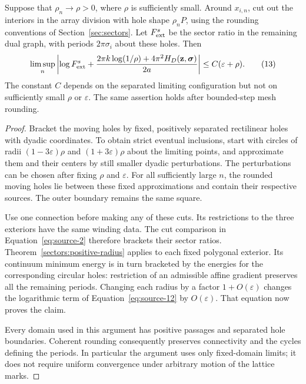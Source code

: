 \begin{lemma}\label{correlations:exterior-lattice}
Suppose that \(\rho_n\to\rho>0\), where \(\rho\) is sufficiently
small.  Around \(x_{i,n}\), cut out the interiors in the array
division with hole shape \(\rho_nP\), using the rounding conventions
of Section~\ref{sec:sectors}.  Let \(F_{\rm ext}^s\) be the sector
ratio in the remaining dual graph, with periods
\(2\pi\sigma_i\) about these holes.  Then
\begin{equation}
 \limsup_n
 \left|
 \log F_{\rm ext}^s+
 \frac{2\pi k\log(1/\rho)+4\pi^2H_D(\mathbf z,\boldsymbol\sigma)}
      {2a}
 \right|
 \leq C(\varepsilon+\rho).
 \tag{13}\label{eq:source-13}
\end{equation}
The constant \(C\) depends on the separated limiting configuration
but not on sufficiently small \(\rho\) or \(\varepsilon\).
The same assertion holds after bounded-step mesh rounding.
\end{lemma}

\begin{proof}
Bracket the moving holes by fixed, positively separated rectilinear
holes with dyadic coordinates.  To obtain strict eventual inclusions,
start with circles of radii \((1-3\varepsilon)\rho\) and
\((1+3\varepsilon)\rho\) about the limiting points, and approximate
them and their centers by still smaller dyadic perturbations.
The perturbations can be chosen after fixing \(\rho\) and
\(\varepsilon\).  For all sufficiently large \(n\), the rounded
moving holes lie between these fixed approximations and contain
their respective sources.  The outer boundary remains the same square.

Use one connection before making any of these cuts.  Its restrictions
to the three exteriors have the same winding data.  The cut comparison
in Equation~\eqref{eq:source-2} therefore brackets their sector ratios.
Theorem~\ref{sectors:positive-radius} applies to each fixed polygonal
exterior.  Its continuum minimum energy is in turn bracketed by the
energies for the corresponding circular holes: restriction of an
admissible affine gradient preserves all the remaining periods.
Changing each radius by a factor \(1+O(\varepsilon)\) changes the
logarithmic term of Equation~\eqref{eq:source-12} by
\(O(\varepsilon)\).  That equation now proves the claim.

Every domain used in this argument has positive passages and
separated hole boundaries.  Coherent rounding consequently preserves
connectivity and the cycles defining the periods.  In particular the
argument uses only fixed-domain limits; it does not require uniform
convergence under arbitrary motion of the lattice marks.
\end{proof}

